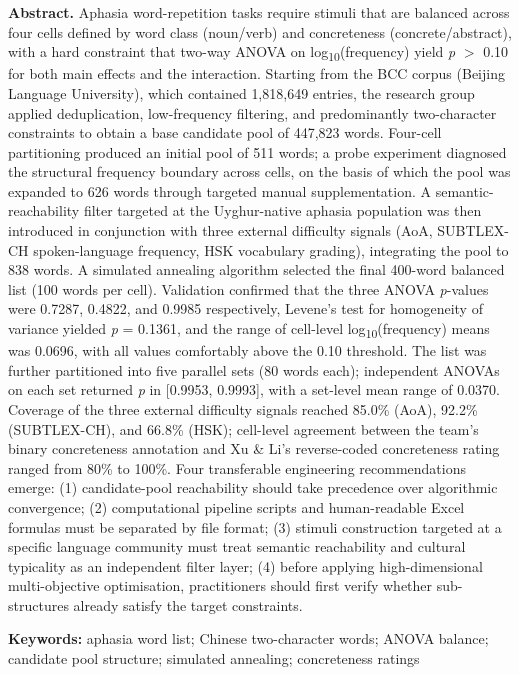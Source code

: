 \documentclass[12pt, a4paper]{article}
\begin{document}
\vspace{1em}
\noindent\textbf{Abstract.} Aphasia word-repetition tasks require stimuli that are balanced across four cells defined by word class (noun/verb) and concreteness (concrete/abstract), with a hard constraint that two-way ANOVA on log\textsubscript{10}(frequency) yield \textit{p} $>$ 0.10 for both main effects and the interaction. Starting from the BCC corpus (Beijing Language University), which contained 1,818,649 entries, the research group applied deduplication, low-frequency filtering, and predominantly two-character constraints to obtain a base candidate pool of 447,823 words. Four-cell partitioning produced an initial pool of 511 words; a probe experiment diagnosed the structural frequency boundary across cells, on the basis of which the pool was expanded to 626 words through targeted manual supplementation. A semantic-reachability filter targeted at the Uyghur-native aphasia population was then introduced in conjunction with three external difficulty signals (AoA, SUBTLEX-CH spoken-language frequency, HSK vocabulary grading), integrating the pool to 838 words. A simulated annealing algorithm selected the final 400-word balanced list (100 words per cell). Validation confirmed that the three ANOVA \textit{p}-values were 0.7287, 0.4822, and 0.9985 respectively, Levene's test for homogeneity of variance yielded \textit{p} = 0.1361, and the range of cell-level log\textsubscript{10}(frequency) means was 0.0696, with all values comfortably above the 0.10 threshold. The list was further partitioned into five parallel sets (80 words each); independent ANOVAs on each set returned \textit{p} in [0.9953, 0.9993], with a set-level mean range of 0.0370. Coverage of the three external difficulty signals reached 85.0\% (AoA), 92.2\% (SUBTLEX-CH), and 66.8\% (HSK); cell-level agreement between the team's binary concreteness annotation and Xu \& Li's reverse-coded concreteness rating ranged from 80\% to 100\%. Four transferable engineering recommendations emerge: (1) candidate-pool reachability should take precedence over algorithmic convergence; (2) computational pipeline scripts and human-readable Excel formulas must be separated by file format; (3) stimuli construction targeted at a specific language community must treat semantic reachability and cultural typicality as an independent filter layer; (4) before applying high-dimensional multi-objective optimisation, practitioners should first verify whether sub-structures already satisfy the target constraints.

\vspace{0.5em}
\noindent\textbf{Keywords:} aphasia word list; Chinese two-character words; ANOVA balance; candidate pool structure; simulated annealing; concreteness ratings
\end{document}

